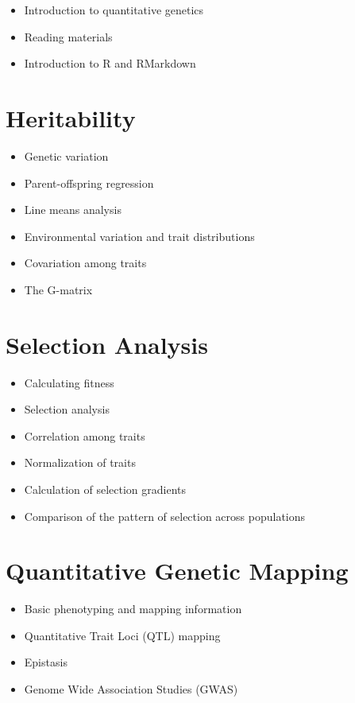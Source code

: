 \documentclass[
]{book}
\providecommand{\tightlist}{%
  \setlength{\itemsep}{0pt}\setlength{\parskip}{0pt}}
\begin{document}
\begin{itemize}
\tightlist
\item
  Introduction to quantitative genetics
\item
  Reading materials
\item
  Introduction to R and RMarkdown
\end{itemize}

\hypertarget{heritability}{%
\section{Heritability}\label{heritability}}

\begin{itemize}
\tightlist
\item
  Genetic variation
\item
  Parent-offspring regression
\item
  Line means analysis
\item
  Environmental variation and trait distributions
\item
  Covariation among traits
\item
  The G-matrix
\end{itemize}

\hypertarget{selection-analysis}{%
\section{Selection Analysis}\label{selection-analysis}}

\begin{itemize}
\tightlist
\item
  Calculating fitness
\item
  Selection analysis
\item
  Correlation among traits
\item
  Normalization of traits
\item
  Calculation of selection gradients
\item
  Comparison of the pattern of selection across populations
\end{itemize}

\hypertarget{quantitative-genetic-mapping}{%
\section{Quantitative Genetic Mapping}\label{quantitative-genetic-mapping}}

\begin{itemize}
\tightlist
\item
  Basic phenotyping and mapping information
\item
  Quantitative Trait Loci (QTL) mapping
\item
  Epistasis
\item
  Genome Wide Association Studies (GWAS)
\end{itemize}
\end{document}
